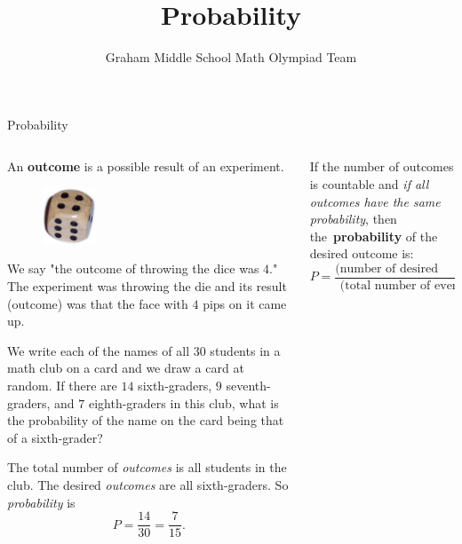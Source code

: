 \documentclass[9pt,aspectratio=169]{beamer}
\title{Probability}
\subtitle[Graham Middle School]{Graham Middle School Math Olympiad Team}
\begin{document}
\maketitle

\begin{frame}{Probability}
  \begin{columns}[T]
    \begin{column}{0.5\textwidth}
      \begin{definition}
        An \textbf{outcome} is a possible result of an experiment.
      \end{definition}

      \begin{figure}%
        \vspace{-1em}
        \includegraphics[width=0.25\textwidth]{03 - Probability/dice-4.png}
      \end{figure}
      We say "the outcome of throwing the dice was $4$." The experiment was throwing the die and its result (outcome) was that the face with $4$ pips on it came up.\medskip
  
      \begin{problem}
        We write each of the names of all $30$ students in a math club on a card and we draw a card at random. If there are $14$ sixth-graders, $9$ seventh-graders, and $7$ eighth-graders in this club, what is the probability of the name on the card being that of a sixth-grader? 
      \end{problem}
      The total number of \emph{outcomes} is all students in the club. The desired \emph{outcomes} are all sixth-graders. So \emph{probability} is
      \[
        P = \frac{14}{30} = \frac{7}{15}.
      \]
    \end{column}
    \begin{column}{0.5\textwidth}
      \begin{definition}
        If the number of outcomes is countable and \emph{if all outcomes have the same probability}, then \mbox{the~\textbf{probability}} of the desired outcome is:
        \[ P = \frac{\text{(number of desired outcomes)}}{\text{(total number of events)}}. \]
        \vspace*{-1.5ex}
      \end{definition}


\end{column}
\end{columns}
\end{frame}
\end{document}
